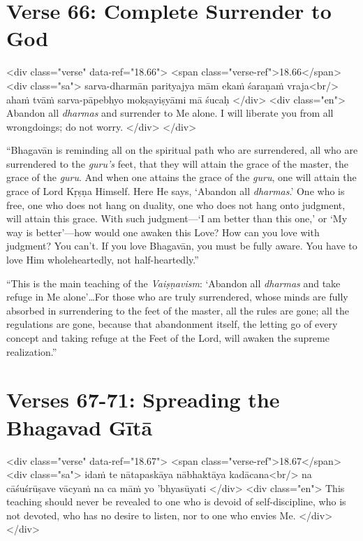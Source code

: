 \section{Verse 66: Complete Surrender to God}\label{sec-verse-66-complete-surrender-to-god}


\begin{html}
<div class="verse" data-ref="18.66">
  <span class="verse-ref">18.66</span>
  <div class="sa">
    sarva-dharmān parityajya mām ekaṁ śaraṇaṁ vraja<br/>
    ahaṁ tvāṁ sarva-pāpebhyo mokṣayiṣyāmi mā śucaḥ
  </div>
  <div class="en">
    Abandon all \textit{dharmas} and surrender to Me alone. I will liberate you from all wrongdoings; do not worry.
  </div>
</div>
\end{html}


\enquote{Bhagavān is reminding all on the spiritual path who are surrendered, all who are surrendered to the \textit{guru’s} feet, that they will attain the grace of the master, the grace of the \textit{guru}. And when one attains the grace of the \textit{guru}, one will attain the grace of Lord Kṛṣṇa Himself. Here He says, \enquote{Abandon all \textit{dharmas}.} One who is free, one who does not hang on duality, one who does not hang onto judgment, will attain this grace. With such judgment---\enquote{I am better than this one,} or \enquote{My way is better}---how would one awaken this Love? How can you love with judgment? You can’t. If you love Bhagavān, you must be fully aware. You have to love Him wholeheartedly, not half-heartedly.}

\enquote{This is the main teaching of the \textit{Vaiṣṇavism}: \enquote{Abandon all \textit{dharmas} and take refuge in Me alone}\ldots For those who are truly surrendered, whose minds are fully absorbed in surrendering to the feet of the master, all the rules are gone; all the regulations are gone, because that abandonment itself, the letting go of every concept and taking refuge at the Feet of the Lord, will awaken the supreme realization.}

\section{Verses 67-71: Spreading the Bhagavad Gītā}\label{sec-verses-67-71-spreading-the-bhagavad-gita}


\begin{html}
<div class="verse" data-ref="18.67">
  <span class="verse-ref">18.67</span>
  <div class="sa">
    idaṁ te nātapaskāya nābhaktāya kadācana<br/>
    na cāśuśrūṣave vācyaṁ na ca māṁ yo ’bhyasūyati
  </div>
  <div class="en">
    This teaching should never be revealed to one who is devoid of self-discipline, who is not devoted, who has no desire to listen, nor to one who envies Me.
  </div>
</div>
\end{html}



